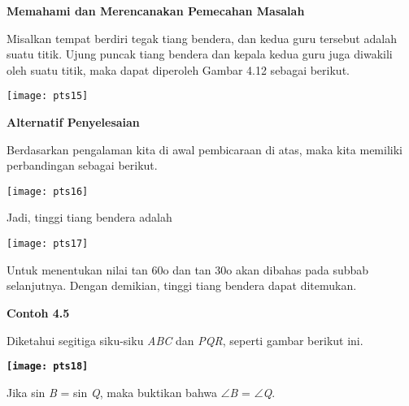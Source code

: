 \documentclass[11pt,fleqn]{book} %
\begin{document}
\begin{myEnumerate}
\begin{itemize}
\noindent 

\noindent \textbf{Memahami dan Merencanakan Pemecahan Masalah}

\noindent \textbf{}

\noindent Misalkan tempat berdiri tegak tiang bendera, dan kedua guru tersebut adalah suatu titik. Ujung puncak tiang bendera dan kepala kedua guru juga diwakili oleh suatu titik, maka dapat diperoleh Gambar 4.12 sebagai berikut.

\noindent 

\noindent \texttt{[image: pts15]}

\noindent 

\noindent \textbf{Alternatif Penyelesaian}

\noindent \textbf{}

\noindent Berdasarkan pengalaman kita di awal pembicaraan di atas, maka kita memiliki perbandingan sebagai berikut.

\noindent 

\noindent \texttt{[image: pts16]}

\noindent 

\noindent Jadi, tinggi tiang bendera adalah

\noindent 

\noindent \texttt{[image: pts17]}

\noindent 

\noindent Untuk menentukan nilai tan 60o dan tan 30o akan dibahas pada subbab selanjutnya. Dengan demikian, tinggi tiang bendera dapat ditemukan.

\noindent 

\noindent \textbf{Contoh 4.5}

\noindent \textbf{}

\noindent Diketahui segitiga siku-siku \textit{ABC }dan \textit{PQR}, seperti gambar berikut ini.

\noindent 

\noindent \textbf{\texttt{[image: pts18]}}

\noindent 

\noindent Jika sin \textit{B }= sin \textit{Q}, maka buktikan bahwa $\mathrm{\angle}$\textit{B }= $\mathrm{\angle}$\textit{Q}.

\noindent 

\noindent 

\noindent 


\end{itemize}
\end{myEnumerate}
\end{document}

